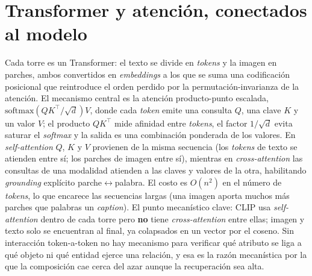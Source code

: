 \documentclass[10pt,a4paper]{article}
\begin{document}
\section{Transformer y atención, conectados al modelo}
Cada torre es un Transformer: el texto se divide en \emph{tokens} y la imagen en parches, ambos
convertidos en \emph{embeddings} a los que se suma una codificación posicional que reintroduce el
orden perdido por la permutación-invarianza de la atención. El mecanismo central es la atención
producto-punto escalada, $\mathrm{softmax}\!\left(QK^{\top}/\sqrt{d}\right)V$, donde cada
\emph{token} emite una consulta $Q$, una clave $K$ y un valor $V$; el producto $QK^{\top}$ mide
afinidad entre \emph{tokens}, el factor $1/\sqrt{d}$ evita saturar el \emph{softmax} y la salida es
una combinación ponderada de los valores. En \emph{self-attention} $Q$, $K$ y $V$ provienen de la
misma secuencia (los \emph{tokens} de texto se atienden entre sí; los parches de imagen entre sí),
mientras en \emph{cross-attention} las consultas de una modalidad atienden a las claves y valores de
la otra, habilitando \emph{grounding} explícito parche$\leftrightarrow$palabra. El costo es
$O(n^2)$ en el número de \emph{tokens}, lo que encarece las secuencias largas (una imagen aporta
muchos más parches que palabras un \emph{caption}). El punto mecanístico clave: CLIP usa
\emph{self-attention} dentro de cada torre pero \textbf{no} tiene \emph{cross-attention} entre
ellas; imagen y texto solo se encuentran al final, ya colapsados en un vector por el coseno. Sin
interacción token-a-token no hay mecanismo para verificar qué atributo se liga a qué objeto ni qué
entidad ejerce una relación, y esa es la razón mecanística por la que la composición cae cerca del
azar aunque la recuperación sea alta.
\end{document}
